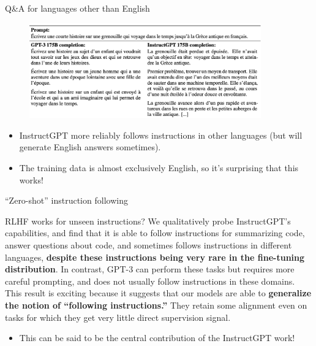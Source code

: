 \begin{vbframe}{Q\&A for languages other than English}

\vfill

\begin{figure}
\centering
\includegraphics[width = 10cm]{figure/nonenglish.png}
\end{figure}

\begin{itemize}
	\item InstructGPT more reliably follows instructions
	in other languages (but will generate English
	answers sometimes).
        \item The training data is almost exclusively
	English, so it's surprising that this works!
\end{itemize}

\vfill

\end{vbframe}

\begin{vbframe}{``Zero-shot'' instruction following}



\begin{block}{RLHF works for unseen instructions?}
We qualitatively probe InstructGPT’s capabilities, and find
that it is able to follow instructions for summarizing code,
answer questions about code, and sometimes follows
instructions in different languages, \textbf{despite these
instructions being very rare in the fine-tuning
distribution}. In contrast, GPT-3 can perform these tasks but
requires more careful prompting, and does not usually follow
instructions in these domains. This result is exciting
because it suggests that our models are able to \textbf{generalize
the notion of “following instructions.”} They retain some
alignment even on tasks for which they get very little
direct supervision signal.
\end{block}


\begin{itemize}
	\item This can be said to be the central contribution
	of the InstructGPT work!
\end{itemize}

\vfill


\end{vbframe}




